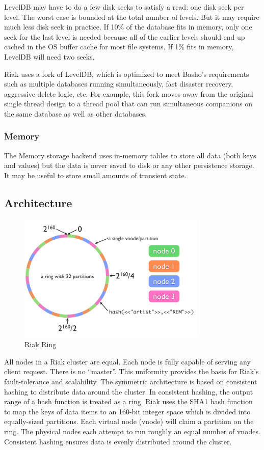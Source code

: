 \documentclass[11pt]{book}
\begin{document}
LevelDB may have to do a few disk seeks to satisfy a read: one disk seek per level. The worst case is bounded at the total number of levels. But it may require much less disk seek in practice. If 10\% of the database fits in memory, only one seek for the last level is needed because all of the earlier levels should end up cached in the OS buffer cache for most file systems. If 1\% fits in memory, LevelDB will need two seeks.

Riak uses a fork of LevelDB, which is optimized to meet Basho's requirements such as multiple databases running simultaneously, fast disaster recovery, aggressive delete logic, etc. For example, this fork moves away from the original single thread design to a thread pool that can run simultaneous companions on the same database as well as other databases.

\subsubsection{Memory}
The Memory storage backend uses in-memory tables to store all data (both keys and values) but the data is never saved to disk or any other persistence storage. It may be useful to store small amounts of transient state.

\subsection{Architecture}

\begin{figure}[t]
\includegraphics[width=0.8\textwidth]{images/riak-ring.png}
\centering
\caption{Riak Ring}
\end{figure}

All nodes in a Riak cluster are equal. Each node is fully capable of serving any client request. There is no ``master''. This uniformity provides the basis for Riak's fault-tolerance and scalability. The symmetric architecture is based on consistent hashing to distribute data around the cluster. In consistent hashing, the output range of a hash function is treated as a ring. Riak uses the SHA1 hash function to map the keys of data items to an 160-bit integer space which is divided into equally-sized partitions. Each virtual node (vnode) will claim a partition on the ring. The physical nodes each attempt to run roughly an equal number of vnodes. Consistent hashing ensures data is evenly distributed around the cluster.
\end{document}
